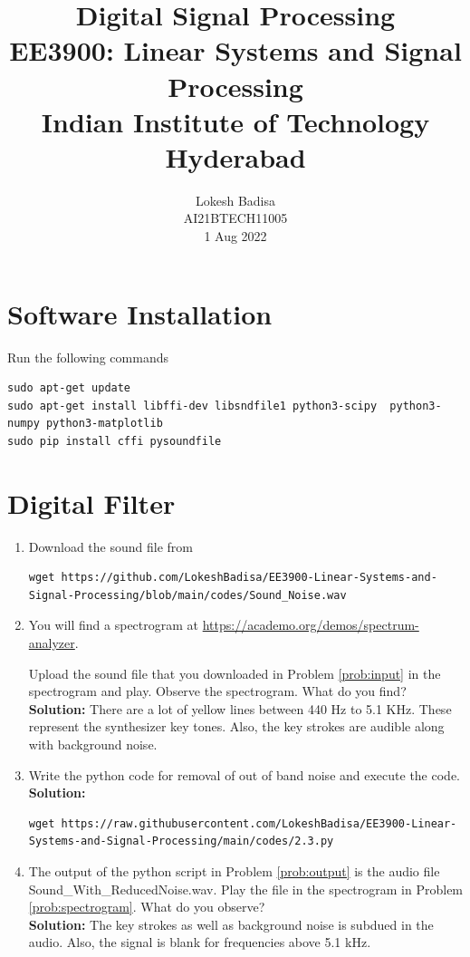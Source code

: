 \documentclass[journal,12pt,twocolumn]{IEEEtran}
\newcommand{\solution}{\noindent \textbf{Solution: }}
\numberwithin{equation}{section}
\renewcommand\thesection{\arabic{section}}
\begin{document}
                             
\title{ Digital Signal Processing \\ \Large EE3900: Linear Systems and Signal Processing \\ \large Indian Institute of Technology Hyderabad}
\author{Lokesh Badisa \\ \normalsize AI21BTECH11005 \\ \vspace*{20pt} \normalsize 1 Aug 2022}   
 \maketitle 
 \tableofcontents
\section{Software Installation}
Run the following commands
\begin{lstlisting}
sudo apt-get update
sudo apt-get install libffi-dev libsndfile1 python3-scipy  python3-numpy python3-matplotlib 
sudo pip install cffi pysoundfile 
\end{lstlisting}
\section{Digital Filter}
\begin{enumerate}[label=\thesection.\arabic*
,ref=\thesection.\theenumi]
\item
\label{prob:input}
Download the sound file from  
\begin{lstlisting}
wget https://github.com/LokeshBadisa/EE3900-Linear-Systems-and-Signal-Processing/blob/main/codes/Sound_Noise.wav
\end{lstlisting}
\item
\label{prob:spectrogram}
You will find a spectrogram at \href{https://academo.org/demos/spectrum-analyzer}{\url{https://academo.org/demos/spectrum-analyzer}}. 

Upload the sound file that you downloaded in Problem \ref{prob:input} in the spectrogram  and play.  Observe the spectrogram. What do you find?
\\
%
\solution There are a lot of yellow lines between 440 Hz to 5.1 KHz.  These represent the synthesizer key tones. Also, the key strokes
are audible along with background noise.
\item
\label{prob:output}
Write the python code for removal of out of band noise and execute the code.
\\
\solution
\begin{lstlisting}
wget https://raw.githubusercontent.com/LokeshBadisa/EE3900-Linear-Systems-and-Signal-Processing/main/codes/2.3.py
\end{lstlisting}

\item
The output of the python script in Problem \ref{prob:output} is the audio file Sound\_With\_ReducedNoise.wav. Play the file in the spectrogram in Problem \ref{prob:spectrogram}. What do you observe?
\\
\solution The key strokes as well as background noise is subdued in the audio.  Also,  the signal is blank for frequencies above 5.1 kHz.

\end{enumerate}
\end{document}
